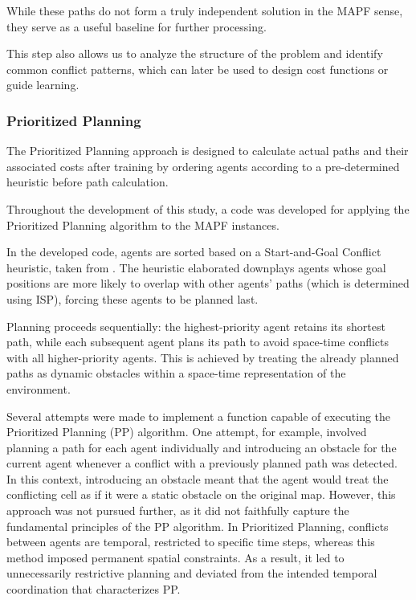 While these paths do not form a truly independent solution in the MAPF sense, they serve as a useful baseline for further processing.

This step also allows us to analyze the structure of the problem and identify common conflict patterns, which can later be used to design cost functions or guide learning.

\subsubsection{Prioritized Planning}

The Prioritized Planning approach is designed to calculate actual paths and their associated costs after training by ordering agents according to a pre-determined heuristic before path calculation.

Throughout the development of this study, a code was developed for applying the Prioritized Planning algorithm to the MAPF instances.

In the developed code, agents are sorted based on a Start-and-Goal Conflict heuristic, taken from \cite{buckleyFastMotionPlanning1989}. The heuristic elaborated downplays agents whose goal positions are more likely to overlap with other agents' paths (which is determined using ISP), forcing these agents to be planned last.

Planning proceeds sequentially: the highest-priority agent retains its shortest path, while each subsequent agent plans its path to avoid space-time conflicts with all higher-priority agents. This is achieved by treating the already planned paths as dynamic obstacles within a space-time representation of the environment.

Several attempts were made to implement a function capable of executing the Prioritized Planning (PP) algorithm. One attempt, for example, involved planning a path for each agent individually and introducing an obstacle for the current agent whenever a conflict with a previously planned path was detected. In this context, introducing an obstacle meant that the agent would treat the conflicting cell as if it were a static obstacle on the original map. However, this approach was not pursued further, as it did not faithfully capture the fundamental principles of the PP algorithm. In Prioritized Planning, conflicts between agents are temporal, restricted to specific time steps, whereas this method imposed permanent spatial constraints. As a result, it led to unnecessarily restrictive planning and deviated from the intended temporal coordination that characterizes PP.


